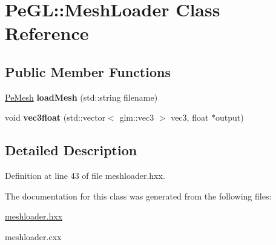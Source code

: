\hypertarget{classPeGL_1_1MeshLoader}{\section{Pe\-G\-L\-:\-:Mesh\-Loader Class Reference}
\label{classPeGL_1_1MeshLoader}
}
\subsection*{Public Member Functions}
\begin{DoxyCompactItemize}
\item 
\hypertarget{classPeGL_1_1MeshLoader_a5c1171a87a55e65b3c0e64af9997c6ea}{\hyperlink{structPeGL_1_1PeMesh}{Pe\-Mesh} {\bfseries load\-Mesh} (std\-::string filename)}\label{classPeGL_1_1MeshLoader_a5c1171a87a55e65b3c0e64af9997c6ea}

\item 
\hypertarget{classPeGL_1_1MeshLoader_afd4272a84e7e7943b314d451b00d996d}{void {\bfseries vec3float} (std\-::vector$<$ glm\-::vec3 $>$ vec3, float $\ast$output)}\label{classPeGL_1_1MeshLoader_afd4272a84e7e7943b314d451b00d996d}

\end{DoxyCompactItemize}


\subsection{Detailed Description}


Definition at line 43 of file meshloader.\-hxx.



The documentation for this class was generated from the following files\-:\begin{DoxyCompactItemize}
\item 
\hyperlink{meshloader_8hxx}{meshloader.\-hxx}\item 
meshloader.\-cxx\end{DoxyCompactItemize}
